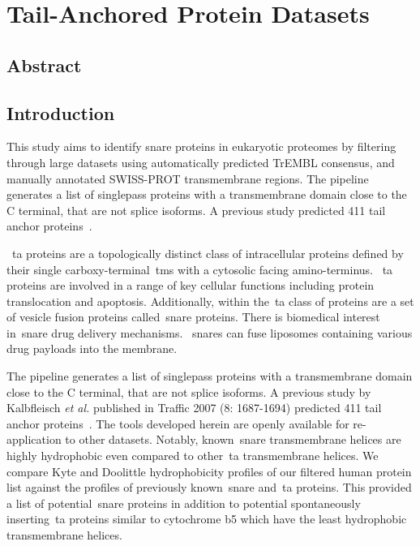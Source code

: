 \chapter{Tail-Anchored Protein Datasets}
\sloppy
\section{Abstract}

\section{Introduction}
This study aims to identify \gls{snare} proteins in eukaryotic proteomes by filtering through large datasets using automatically predicted TrEMBL consensus, and manually annotated SWISS-PROT transmembrane regions.
The pipeline generates a list of singlepass proteins with a transmembrane domain close to the C terminal, that are not splice isoforms.
A previous study predicted 411 tail anchor proteins~\cite{Kalbfleisch2007}.

~\gls{ta} proteins are a topologically distinct class of intracellular proteins defined by their single carboxy-terminal~\gls{tms} with a cytosolic facing amino-terminus.
~\gls{ta} proteins are involved in a range of key cellular functions including protein translocation and apoptosis.
Additionally, within the~\gls{ta} class of proteins are a set of vesicle fusion proteins called~\gls{snare} proteins.
There is biomedical interest in~\gls{snare} drug delivery mechanisms.
~\gls{snare}s can fuse liposomes containing various drug payloads into the membrane.

The pipeline generates a list of singlepass proteins with a transmembrane domain close to the C terminal, that are not splice isoforms.
A previous study by Kalbfleisch \textit{et al.} published in Traffic 2007 (8: 1687-1694) predicted 411 tail anchor proteins~\cite{Kalbfleisch2007}.
The tools developed herein are openly available for re-application to other datasets.
Notably, known~\gls{snare} transmembrane helices are highly hydrophobic even compared to other~\gls{ta} transmembrane helices.
We compare Kyte and Doolittle hydrophobicity profiles of our filtered human protein list against the profiles of previously known~\gls{snare} and~\gls{ta} proteins.
This provided a list of potential~\gls{snare} proteins in addition to potential spontaneously inserting~\gls{ta} proteins similar to cytochrome b5 which have the least hydrophobic transmembrane helices.

